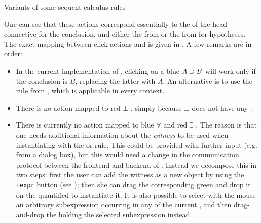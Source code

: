\begin{scope}
\begin{marginfigure}
  \caption{Variants of some sequent calculus rules}
\end{marginfigure}

One can see that these actions correspond essentially to the  of the head connective for the conclusion, and either the
 from  or the  from
 for hypotheses. The exact mapping between click actions and
 is given in . A few remarks are in
order:
\begin{itemize}
  \item In the current implementation of , clicking on a blue
   $A \supset B$ will work only if the conclusion is $B$, replacing the
  latter with $A$. An alternative is to use the {} rule from
  , which is applicable in every context.
  
  \item There is no action mapped to red $\bot$ , simply because
  $\bot$ does not have any .

  \item There is currently no action mapped to blue $∀$ and red $∃$ .
  The reason is that one needs additional information about the \emph{witness}
  to be used when instantiating with the  or  rule.
  This could be provided with further input (e.g. from a dialog box), but this
  would need a change in the communication protocol between the frontend and
  backend of . Instead we decompose this in two steps: first the user
  can add the witness as a new object by using the \texttt{+expr} button (see
  ); then she can drag the corresponding green  and
  drop it on the quantified  to instantiate it. It is also possible to
  select with the mouse an arbitrary subexpression occurring in any  of
  the current , and then drag-and-drop the  holding the
  selected subexpression instead.
\end{itemize}


\end{scope}
